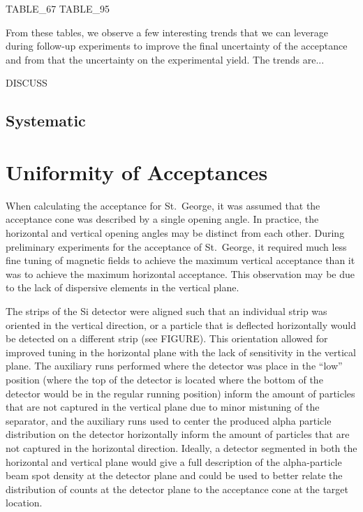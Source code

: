 TABLE_67
TABLE_95

From these tables, we observe a few interesting trends that we can
leverage during follow-up experiments to improve the final uncertainty
of the acceptance and from that the uncertainty on the experimental
yield. The trends are...

DISCUSS

\subsection{Systematic}


\section{Uniformity of Acceptances}
\label{sec:uniformity-of-acceptances}

When calculating the acceptance for St.\ George, it was assumed that the
acceptance cone was described by a single opening angle. In practice,
the horizontal and vertical opening angles may be distinct from each
other. During preliminary experiments for the acceptance of St.\ George,
it required much less fine tuning of magnetic fields to achieve the
maximum vertical acceptance than it was to achieve the maximum
horizontal acceptance. This observation may be due to the lack of
dispersive elements in the vertical plane.

The strips of the Si detector were aligned such that an individual strip
was oriented in the vertical direction, or a particle that is deflected
horizontally would be detected on a different strip (see FIGURE).
This orientation allowed for improved tuning in the horizontal plane
with the lack of sensitivity in the vertical plane. The auxiliary runs
performed where the detector was place in the ``low'' position (where
the top of the detector is located where the bottom of the detector
would be in the regular running position) inform the amount of particles
that are not captured in the vertical plane due to minor mistuning of
the separator, and the auxiliary runs used to center the produced alpha
particle distribution on the detector horizontally inform the amount of
particles that are not captured in the horizontal direction. Ideally, a
detector segmented in both the horizontal and vertical plane would give
a full description of the alpha-particle beam spot density at the
detector plane and could be used to better relate the distribution of
counts at the detector plane to the acceptance cone at the target
location.

